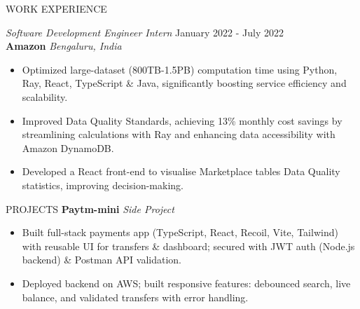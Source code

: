 \documentclass{resume} %
\begin{document}
\begin{rSection}{WORK EXPERIENCE}
 
\textit{Software Development Engineer Intern} \hfill January 2022 - July 2022\\
\textbf{Amazon} \hfill \textit{Bengaluru, India}
 \begin{itemize}
    \vspace{-1pt} %
    \itemsep -4pt {}
    \item Optimized large-dataset (800TB-1.5PB) computation time using Python, Ray, React, TypeScript \& Java, significantly boosting service efficiency and scalability.
    \item Improved Data Quality Standards, achieving 13\% monthly cost savings by streamlining calculations with Ray and enhancing data accessibility with Amazon DynamoDB.
    \item Developed a React front-end to visualise Marketplace tables Data Quality statistics, improving decision-making.
\end{itemize}


\end{rSection} 


\begin{rSection}{PROJECTS}
\textbf{Paytm-mini} \hfill \textit{Side Project}
\begin{itemize}
    \vspace{-1pt} %
    \itemsep -3pt {}
    \item Built full-stack payments app (TypeScript, React, Recoil, Vite, Tailwind) with reusable UI for transfers \& dashboard; secured with JWT auth (Node.js backend) \& Postman API validation.
    \item Deployed backend on AWS; built responsive features: debounced search, live balance, and validated transfers with error handling.
\end{itemize}
\end{rSection}
\end{document}
